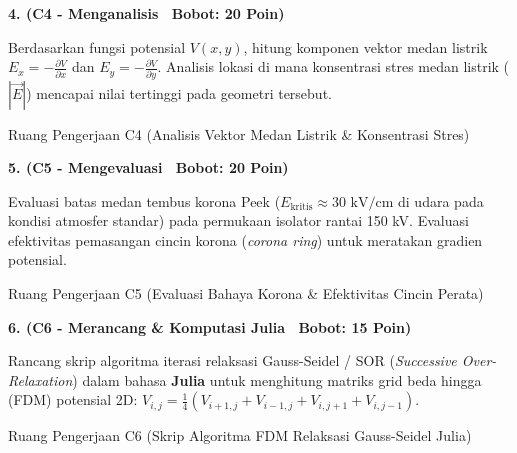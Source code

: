 \documentclass[10pt,a4paper]{article}
\begin{document}
\newpage

\noindent\textbf{4. (C4 - Menganalisis \textbar\ Bobot: 20 Poin)}\par\vspace{0.5mm}
{\footnotesize Berdasarkan fungsi potensial $V(x,y)$, hitung komponen vektor medan listrik $E_x = -\frac{\partial V}{\partial x}$ dan $E_y = -\frac{\partial V}{\partial y}$. Analisis lokasi di mana konsentrasi stres medan listrik ($|\vec{E}|$) mencapai nilai tertinggi pada geometri tersebut.}
\begin{answerbox}{Ruang Pengerjaan C4 (Analisis Vektor Medan Listrik \& Konsentrasi Stres)}
  \vspace{3.8cm}
\end{answerbox}

\vspace{1.5mm}

\noindent\textbf{5. (C5 - Mengevaluasi \textbar\ Bobot: 20 Poin)}\par\vspace{0.5mm}
{\footnotesize Evaluasi batas medan tembus korona Peek ($E_{\text{kritis}} \approx 30\text{ kV/cm}$ di udara pada kondisi atmosfer standar) pada permukaan isolator rantai 150 kV. Evaluasi efektivitas pemasangan cincin korona (\textit{corona ring}) untuk meratakan gradien potensial.}
\begin{answerbox}{Ruang Pengerjaan C5 (Evaluasi Bahaya Korona \& Efektivitas Cincin Perata)}
  \vspace{3.8cm}
\end{answerbox}

\vspace{1.5mm}

\noindent\textbf{6. (C6 - Merancang \& Komputasi Julia \textbar\ Bobot: 15 Poin)}\par\vspace{0.5mm}
{\footnotesize Rancang skrip algoritma iterasi relaksasi Gauss-Seidel / SOR (\textit{Successive Over-Relaxation}) dalam bahasa \textbf{Julia} untuk menghitung matriks grid beda hingga (FDM) potensial 2D: $V_{i,j} = \frac{1}{4}(V_{i+1,j} + V_{i-1,j} + V_{i,j+1} + V_{i,j-1})$.}
\begin{answerbox}{Ruang Pengerjaan C6 (Skrip Algoritma FDM Relaksasi Gauss-Seidel Julia)}
  \vspace{3.8cm}
\end{answerbox}

\vspace{1.5mm}
\end{document}
